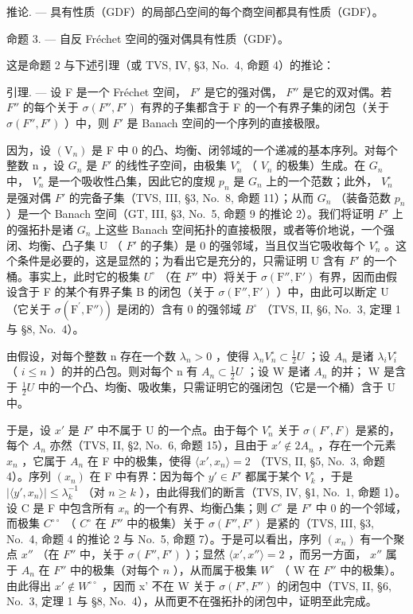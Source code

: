 推论. --- 具有性质（GDF）的局部凸空间的每个商空间都具有性质（GDF）。

命题 3. --- 自反 Fréchet 空间的强对偶具有性质（GDF）。

这是命题 2 与下述引理（或 TVS, IV, §3, No.~4, 命题 4）的推论：

引理. --- 设 F 是一个 Fréchet 空间， \(F'\) 是它的强对偶， \(F''\) 是它的双对偶。若 \(F''\) 的每个关于 \(\sigma(F'', F')\) 有界的子集都含于 F 的一个有界子集的闭包（关于 \(\sigma(F'', F')\) ）中，则 \(F'\) 是 Banach 空间的一个序列的直接极限。

因为，设 \((\mathrm{V}_{n})\) 是 F 中 0 的凸、均衡、闭邻域的一个递减的基本序列。对每个整数 n ，设 \(G_{n}\) 是 \(F'\) 的线性子空间，由极集 \(V_{n}^{\circ}\) （ \(V_{n}\) 的极集）生成。在 \(G_{n}\) 中， \(V_{n}^{\circ}\) 是一个吸收性凸集，因此它的度规 \(p_{n}\) 是 \(G_{n}\) 上的一个范数；此外， \(V_{n}^{\circ}\) 是强对偶 \(F'\) 的完备子集（TVS, III, §3, No.~8, 命题 11）；从而 \(G_{n}\) （装备范数 \(p_{n}\) ）是一个 Banach 空间（GT, III, §3, No.~5, 命题 9 的推论 2）。我们将证明 \(F'\) 上的强拓扑是诸 \(G_{n}\) 上这些 Banach 空间拓扑的直接极限，或者等价地说，一个强闭、均衡、凸子集 U （ \(F'\) 的子集）是 0 的强邻域，当且仅当它吸收每个 \(V_{n}^{\circ}\) 。这个条件是必要的，这是显然的；为看出它是充分的，只需证明 U 含有 \(F'\) 的一个桶。事实上，此时它的极集 \(U^{\circ}\) （在 \(F''\) 中）将关于 \(\sigma(\mathrm{F}''\mathrm{,}\mathrm{F}')\) 有界，因而由假设含于 F 的某个有界子集 B 的闭包（关于 \(\sigma(\mathrm{F}''\mathrm{,}\mathrm{F}')\) ）中，由此可以断定 U （它关于 \(\sigma(\mathrm{F}^{\prime},\mathrm{F}''\mathrm{)})\) 是闭的）含有 0 的强邻域 \(B^{\circ}\) （TVS, II, §6, No.~3, 定理 1 与 §8, No.~4）。

由假设，对每个整数 n 存在一个数 \(\lambda_{n}>0\) ，使得 \(\lambda_{n}V_{n}^{\circ}\subset\frac{1}{2}U\) ；设 \(A_{n}\) 是诸 \(\lambda_{i}V_{i}^{\circ}\) （ \(i\leqslant n\) ）的并的凸包。则对每个 n 有 \(A_{n}\subset\frac{1}{2}U\) ；设 W 是诸 \(A_{n}\) 的并； W 是含于 \(\frac{1}{2}U\) 中的一个凸、均衡、吸收集，只需证明它的强闭包（它是一个桶）含于 U 中。

于是，设 \(x'\) 是 \(F'\) 中不属于 U 的一个点。由于每个 \(V_n^\circ\) 关于 \(\sigma(F', F)\) 是紧的，每个 \(A_n\) 亦然（TVS, II, §2, No.~6, 命题 15），且由于 \(x' \notin 2A_n\) ，存在一个元素 \(x_n\) ，它属于 \(A_n\) 在 F 中的极集，使得 \(\langle x', x_n \rangle = 2\) （TVS, II, §5, No.~3, 命题 4）。序列 \((x_n)\) 在 F 中有界：因为每个 \(y' \in F'\) 都属于某个 \(V_k^\circ\) ，于是 \(|\langle y', x_n \rangle| \leqslant \lambda_k^{-1}\) （对 \(n \geqslant k\) ），由此得我们的断言（TVS, IV, §1, No.~1, 命题 1）。设 C 是 F 中包含所有 \(x_n\) 的一个有界、均衡凸集；则 \(C^\circ\) 是 \(F'\) 中 0 的一个邻域，而极集 \(C^{\circ\circ}\) （ \(C^\circ\) 在 \(F''\) 中的极集）关于 \(\sigma(F'', F')\) 是紧的（TVS, III, §3, No.~4, 命题 4 的推论 2 与 No.~5, 命题 7）。于是可以看出，序列 \((x_n)\) 有一个聚点 \(x''\) （在 \(F''\) 中，关于 \(\sigma(F'', F')\) ）；显然 \(\langle x', x'' \rangle = 2\) ，而另一方面， \(x''\) 属于 \(A_n\) 在 \(F''\) 中的极集（对每个 \(n\) ），从而属于极集 \(W^\circ\) （ W 在 \(F''\) 中的极集）。由此得出 \(x' \notin W^{\circ\circ}\) ，因而 x' 不在 W 关于 \(\sigma(F', F'')\) 的闭包中（TVS, II, §6, No.~3, 定理 1 与 §8, No.~4），从而更不在强拓扑的闭包中，证明至此完成。
